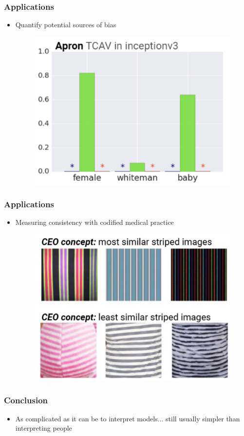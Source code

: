 \documentclass[10pt,mathserif]{beamer}
\begin{document}
\begin{frame}
  \frametitle{Applications}
  \begin{itemize}
  \item Quantify potential sources of bias
    \begin{figure}[ht]
      \centering
      \includegraphics[width=0.7\paperwidth]{figure/cav_app2}
      \caption{\label{fig:cav_app2} }
    \end{figure}
  \end{itemize}  
\end{frame}

\begin{frame}
  \frametitle{Applications}
  \begin{itemize}
  \item Measuring consistency with codified medical practice
    \begin{figure}[ht]
      \centering
      \includegraphics[width=0.7\paperwidth]{figure/cav_app3}
      \caption{\label{fig:cav_app3} }
    \end{figure}
  \end{itemize}  
\end{frame}

\begin{frame}
  \frametitle{Conclusion}
\begin{itemize}
\item As complicated as it can be to interpret models... still usually simpler
  than interpreting people
\end{itemize}
\end{frame}
\end{document}
